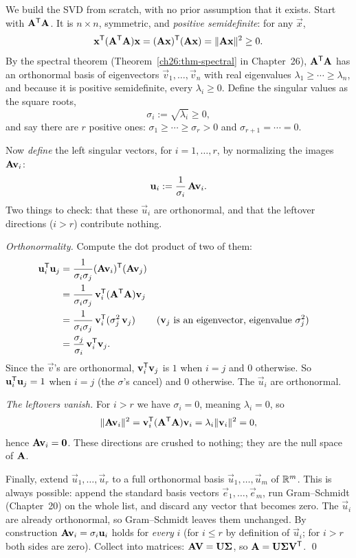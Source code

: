 We build the SVD from scratch, with no prior assumption that it exists. Start with
$\mathbf{A}^{\mathsf{T}}\mathbf{A}$. It is $n\times n$, symmetric, and \emph{positive
semidefinite}: for any $\vec{x}$,
\[
  \mathbf{x}^{\mathsf{T}}(\mathbf{A}^{\mathsf{T}}\mathbf{A})\mathbf{x} = (\mathbf{A}\mathbf{x})^{\mathsf{T}}(\mathbf{A}\mathbf{x})
  = \lVert\mathbf{A}\mathbf{x}\rVert^2 \ge 0.
\]
By the spectral theorem (Theorem~\ref{ch26:thm-spectral} in Chapter~26), $\mathbf{A}^{\mathsf{T}}\mathbf{A}$ has an
orthonormal basis of eigenvectors $\vec{v}_1,\dots,\vec{v}_n$ with real
eigenvalues $\lambda_1 \ge \cdots \ge \lambda_n$, and because it is positive
semidefinite, every $\lambda_i \ge 0$. Define the singular values as the
square roots,
\[
  \sigma_i := \sqrt{\lambda_i} \ge 0,
\]
and say there are $r$ positive ones: $\sigma_1 \ge \cdots \ge \sigma_r > 0$ and
$\sigma_{r+1} = \cdots = 0$.

Now \emph{define} the left singular vectors, for $i = 1,\dots,r$, by normalizing
the images $\mathbf{A}\mathbf{v}_i$:
\[
  \mathbf{u}_i := \frac{1}{\sigma_i}\,\mathbf{A}\mathbf{v}_i.
\]
Two things to check: that these $\vec{u}_i$ are orthonormal, and that the leftover
directions ($i > r$) contribute nothing.

\emph{Orthonormality.} Compute the dot product of two of them:
\begin{align*}
  \mathbf{u}_i^{\mathsf{T}}\mathbf{u}_j
  &= \frac{1}{\sigma_i\sigma_j}(\mathbf{A}\mathbf{v}_i)^{\mathsf{T}}(\mathbf{A}\mathbf{v}_j) \\
  &= \frac{1}{\sigma_i\sigma_j}\,\mathbf{v}_i^{\mathsf{T}}(\mathbf{A}^{\mathsf{T}}\mathbf{A})\mathbf{v}_j \\
  &= \frac{1}{\sigma_i\sigma_j}\,\mathbf{v}_i^{\mathsf{T}}(\sigma_j^2\,\mathbf{v}_j)
     && \text{($\mathbf{v}_j$ is an eigenvector, eigenvalue $\sigma_j^2$)} \\
  &= \frac{\sigma_j}{\sigma_i}\,\mathbf{v}_i^{\mathsf{T}}\mathbf{v}_j.
\end{align*}
Since the $\vec{v}$'s are orthonormal, $\mathbf{v}_i^{\mathsf{T}}\mathbf{v}_j$ is $1$ when $i=j$
and $0$ otherwise. So $\mathbf{u}_i^{\mathsf{T}}\mathbf{u}_j = 1$ when $i=j$ (the $\sigma$'s
cancel) and $0$ otherwise. The $\vec{u}_i$ are orthonormal.

\emph{The leftovers vanish.} For $i > r$ we have $\sigma_i = 0$, meaning
$\lambda_i = 0$, so
\[
  \lVert\mathbf{A}\mathbf{v}_i\rVert^2 = \mathbf{v}_i^{\mathsf{T}}(\mathbf{A}^{\mathsf{T}}\mathbf{A})\mathbf{v}_i
  = \lambda_i \lVert\mathbf{v}_i\rVert^2 = 0,
\]
hence $\mathbf{A}\mathbf{v}_i = \mathbf{0}$. These directions are crushed to nothing; they
are the null space of $\mathbf{A}$.

Finally, extend $\vec{u}_1,\dots,\vec{u}_r$ to a full orthonormal basis
$\vec{u}_1,\dots,\vec{u}_m$ of $\mathbb{R}^m$. This is always possible: append the
standard basis vectors $\vec{e}_1,\dots,\vec{e}_m$, run Gram--Schmidt
(Chapter~20) on the whole list, and discard any vector that becomes zero. The
$\vec{u}_i$ are already orthonormal, so Gram--Schmidt leaves them unchanged.
By construction $\mathbf{A}\mathbf{v}_i = \sigma_i\mathbf{u}_i$ holds for
\emph{every} $i$ (for $i \le r$ by definition of $\vec{u}_i$; for $i > r$ both
sides are zero). Collect into matrices: $\mathbf{A}\mathbf{V} = \mathbf{U}\mathbf{\Sigma}$, so
$\mathbf{A} = \mathbf{U}\mathbf{\Sigma}\mathbf{V}^{\mathsf{T}}$. \qed

